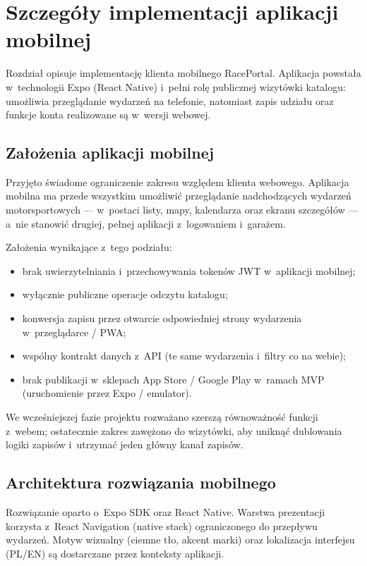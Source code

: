 \documentclass{sprz}
\begin{document}
\chapter{Szczegóły implementacji aplikacji mobilnej}
\label{ch:mobile}
Rozdział opisuje implementację klienta mobilnego RacePortal. Aplikacja powstała w~technologii Expo (React Native) i~pełni rolę publicznej wizytówki katalogu: umożliwia przeglądanie wydarzeń na telefonie, natomiast zapis udziału oraz funkcje konta realizowane są w~wersji webowej.

\section{Założenia aplikacji mobilnej}
Przyjęto świadome ograniczenie zakresu względem klienta webowego. Aplikacja mobilna ma przede wszystkim umożliwić przeglądanie nadchodzących wydarzeń motorsportowych --- w~postaci listy, mapy, kalendarza oraz ekranu szczegółów --- a~nie stanowić drugiej, pełnej aplikacji z~logowaniem i~garażem.

Założenia wynikające z~tego podziału:
\begin{itemize}
  \item brak uwierzytelniania i~przechowywania tokenów JWT w~aplikacji mobilnej;
  \item wyłącznie publiczne operacje odczytu katalogu;
  \item konwersja zapisu przez otwarcie odpowiedniej strony wydarzenia w~przeglądarce / PWA;
  \item wspólny kontrakt danych z~API (te same wydarzenia i~filtry co na webie);
  \item brak publikacji w~sklepach App Store / Google Play w~ramach MVP (uruchomienie przez Expo / emulator).
\end{itemize}
We wcześniejszej fazie projektu rozważano szerszą równoważność funkcji z~webem; ostatecznie zakres zawężono do wizytówki, aby uniknąć dublowania logiki zapisów i~utrzymać jeden główny kanał zapisów.

\section{Architektura rozwiązania mobilnego}
Rozwiązanie oparto o~Expo SDK oraz React Native. Warstwa prezentacji korzysta z~React Navigation (native stack) ograniczonego do przepływu wydarzeń. Motyw wizualny (ciemne tło, akcent marki) oraz lokalizacja interfejsu (PL/EN) są dostarczane przez konteksty aplikacji.
\end{document}
